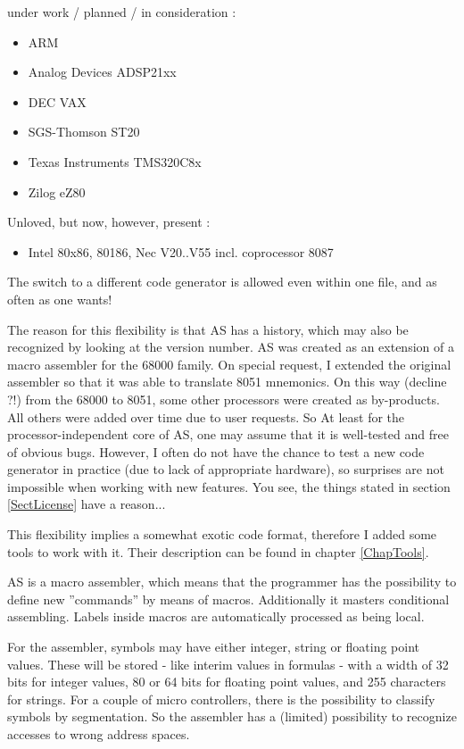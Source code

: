 \documentclass[12pt,twoside]{report}
\newcommand{\asname}{{AS}}
\begin{document}
under work / planned / in consideration :
\begin{itemize}
\item{ARM}
\item{Analog Devices ADSP21xx}
\item{DEC VAX}
\item{SGS-Thomson ST20}
\item{Texas Instruments TMS320C8x}
\item{Zilog eZ80}
\end{itemize}
Unloved, but now, however, present :
\begin{itemize}
\item{Intel 80x86, 80186, Nec V20..V55 incl. coprocessor 8087}
\end{itemize}
The switch to a different code generator is allowed even within one
file, and as often as one wants!

The reason for this flexibility is that \asname{} has a history, which may also
be recognized by looking at the version number. \asname{} was created as an
extension of a macro assembler for the 68000 family. On special request, I
extended the original assembler so that it was able to translate 8051
mnemonics.  On this way (decline ?!) from the 68000 to 8051, some other
processors were created as by-products.  All others were added over time
due to user requests.  So At least for the processor-independent core of
\asname{}, one may assume that it is well-tested and free of obvious bugs.
However, I often do not have the chance to test a new code generator in
practice (due to lack of appropriate hardware), so surprises are not
impossible when working with new features.  You see, the things stated in
section \ref{SectLicense} have a reason...

This flexibility implies a somewhat exotic code format, therefore I
added some tools to work with it. Their description can be found in
chapter \ref{ChapTools}.

\asname{} is a macro assembler, which means that the programmer has the
possibility to define new ''commands'' by means of macros.
Additionally it masters conditional assembling.  Labels inside macros
are automatically processed as being local.

For the assembler, symbols may have either integer, string or floating
point values.  These will be stored - like interim values in formulas -
with a width of 32 bits for integer values, 80 or 64 bits for floating
point values, and 255 characters for strings.  For a couple of micro
controllers, there is the possibility to classify symbols by segmentation.
So the assembler has a (limited) possibility to recognize accesses to
wrong address spaces.
\end{document}
